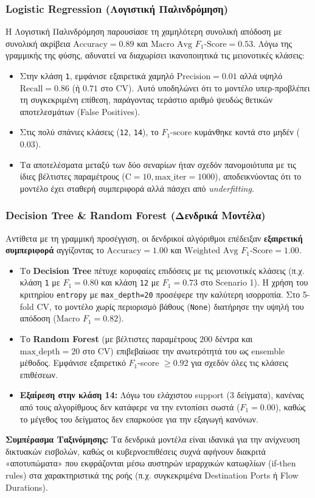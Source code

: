 \documentclass[11pt,a4paper]{article}
\begin{document}
	\subsubsection{Logistic Regression (Λογιστική Παλινδρόμηση)}
	Η Λογιστική Παλινδρόμηση παρουσίασε τη χαμηλότερη συνολική απόδοση με συνολική ακρίβεια $\text{Accuracy} = 0.89$ και $\text{Macro Avg } F_1\text{-Score} = 0.53$. Λόγω της γραμμικής της φύσης, αδυνατεί να διαχωρίσει ικανοποιητικά τις μειονοτικές κλάσεις:
	\begin{itemize}
		\item Στην κλάση \texttt{1}, εμφάνισε εξαιρετικά χαμηλό $\text{Precision} = 0.01$ αλλά υψηλό $\text{Recall} = 0.86$ (ή $0.71$ στο CV). Αυτό υποδηλώνει ότι το μοντέλο υπερ-προβλέπει τη συγκεκριμένη επίθεση, παράγοντας τεράστιο αριθμό ψευδώς θετικών αποτελεσμάτων (False Positives).
		\item Στις πολύ σπάνιες κλάσεις (\texttt{12}, \texttt{14}), το $F_1\text{-score}$ κυμάνθηκε κοντά στο μηδέν ($0.03$).
		\item Τα αποτελέσματα μεταξύ των δύο σεναρίων ήταν σχεδόν πανομοιότυπα με τις ίδιες βέλτιστες παραμέτρους ($\text{C}=10, \text{max\_iter}=1000$), αποδεικνύοντας ότι το μοντέλο έχει σταθερή συμπεριφορά αλλά πάσχει από \textit{underfitting}.
	\end{itemize}
	
	\subsubsection{Decision Tree \& Random Forest (Δενδρικά Μοντέλα)}
	Αντίθετα με τη γραμμική προσέγγιση, οι δενδρικοί αλγόριθμοι επέδειξαν \textbf{εξαιρετική συμπεριφορά} αγγίζοντας το $\text{Accuracy} = 1.00$ και $\text{Weighted Avg } F_1\text{-Score} = 1.00$.
	\begin{itemize}
		\item Το \textbf{Decision Tree} πέτυχε κορυφαίες επιδόσεις με τις μειονοτικές κλάσεις (π.χ. κλάση \texttt{1} με $F_1 = 0.80$ και κλάση \texttt{12} με $F_1 = 0.73$ στο Scenario 1). Η χρήση του κριτηρίου \texttt{entropy} με \texttt{max\_depth=20} προσέφερε την καλύτερη ισορροπία. Στο 5-fold CV, το μοντέλο χωρίς περιορισμό βάθους (\texttt{None}) διατήρησε την υψηλή του απόδοση ($\text{Macro } F_1 = 0.82$).
		\item Το \textbf{Random Forest} (με βέλτιστες παραμέτρους $200$ δέντρα και $\text{max\_depth}=20$ στο CV) επιβεβαίωσε την ανωτερότητά του ως ensemble μέθοδος. Εμφάνισε εξαιρετικό $F_1$-score $\ge 0.92$ για σχεδόν όλες τις κλάσεις επιθέσεων. 
		\item \textbf{Εξαίρεση στην κλάση 14:} Λόγω του ελάχιστου support ($3$ δείγματα), κανένας από τους αλγορίθμους δεν κατάφερε να την εντοπίσει σωστά ($F_1 = 0.00$), καθώς το μέγεθος του δείγματος δεν επαρκούσε για την εξαγωγή κανόνων.
	\end{itemize}
	\textbf{Συμπέρασμα Ταξινόμησης:} Τα δενδρικά μοντέλα είναι ιδανικά για την ανίχνευση δικτυακών εισβολών, καθώς οι κυβερνοεπιθέσεις συχνά αφήνουν διακριτά «αποτυπώματα» που εκφράζονται μέσω αυστηρών ιεραρχικών κατωφλίων (if-then rules) στα χαρακτηριστικά της ροής (π.χ. συγκεκριμένα Destination Ports ή Flow Durations).
	
\end{document}
